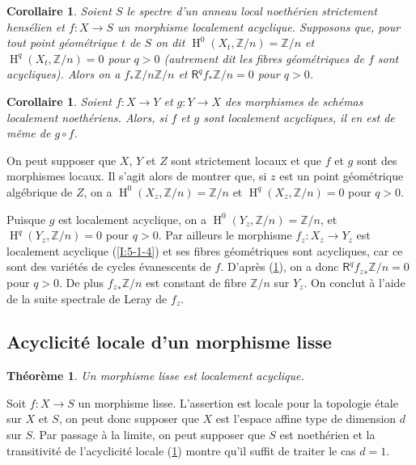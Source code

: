 \documentclass{book}
\DeclareMathOperator{\h}{H}
\newcommand{\dZ}{\mathbb{Z}}
\newcommand{\R}{\mathsf{R}}
\newtheorem{corollary}[subsubsection]{Corollaire}
\newtheorem{theorem}[subsubsection]{Théorème}
\begin{document}
\begin{corollary}\label{I:5-1-9}
Soient $S$ le spectre d'un anneau local noethérien strictement hensélien et 
$f:X\to S$ un morphisme localement acyclique. Supposons que, pour tout point 
géométrique $t$ de $S$ on dit $\h^0(X_t,\dZ/n) = \dZ/n$ et 
$\h^q(X_t,\dZ/n) = 0$ pour $q>0$ (autrement dit les fibres géométriques de 
$f$ sont acycliques). Alors on a $f_* \dZ/n\dZ/n$ et $\R^qf_*\dZ/n = 0$ pour 
$q>0$. 
\end{corollary}





\begin{corollary}\label{I:5-1-10}
Soient $f:X\to Y$ et $g:Y\to X$ des morphismes de schémas localement 
noethériens. Alors, si $f$ et $g$ sont localement acycliques, il en est de 
même de $g\circ f$. 
\end{corollary}

On peut supposer que $X$, $Y$ et $Z$ sont strictement locaux et que $f$ et $g$ 
sont des morphismes locaux. Il s'agit alors de montrer que, si $z$ est un point 
géométrique algébrique de $Z$, on a $\h^0(X_z,\dZ/n) = \dZ/n$ et 
$\h^q(X_z,\dZ/n) = 0$ pour $q>0$. 

Puisque $g$ est localement acyclique, on a $\h^0(Y_z,\dZ/n) = \dZ/n$, et 
$\h^q(Y_z,\dZ/n) = 0$ pour $q>0$. Par ailleurs le morphisme $f_z:X_z\to Y_z$ est 
localement acyclique (\ref{I:5-1-4}) et ses fibres géométriques sont 
acycliques, car ce sont des variétés de cycles évanescents de $f$. 
D'après (\ref{I:5-1-9}), on a donc $\R^q {f_z}_*\dZ/n = 0$ pour $q>0$. De plus 
${f_z}_*\dZ/n$ est constant de fibre $\dZ/n$ sur $Y_z$. On conclut à l'aide de 
la suite spectrale de Leray de $f_z$. 










\subsection{Acyclicité locale d'un morphisme lisse}\label{I:5-2}





\begin{theorem}\label{I:5-2-1}
Un morphisme lisse est localement acyclique.
\end{theorem}

Soit $f:X\to S$ un morphisme lisse. L'assertion est locale pour la topologie 
étale sur $X$ et $S$, on peut donc supposer que $X$ est l'espace affine type 
de dimension $d$ sur $S$. Par passage à la limite, on peut supposer que $S$ 
est noethérien et la transitivité de l'acyclicité locale (\ref{I:5-1-10}) montre 
qu'il suffit de traiter le cas $d=1$. 
\end{document}
